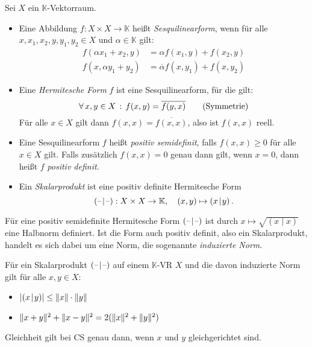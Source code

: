 \documentclass{cheat-sheet}
\newcommand{\K}{\mathbb{K}}
\newcommand{\scp}[2]{\left( #1 \!\mid\! #2 \right)} %
\begin{document}
\begin{defn}
  Sei $X$ ein $\K$-Vektorraum.
  \begin{itemize}
    \item Eine Abbildung $f : X \times X \to \K$ heißt \emph{Sesquilinearform}, wenn für alle $x, x_1, x_2, y, y_1, y_2 \in X$ und $\alpha \in \K$ gilt:
    \begin{align*}
      f(\alpha x_1 + x_2, y) &= \alpha f(x_1, y) + f(x_2, y) \tag*{(Linearität im 1. Arg)} \\
      f(x, \alpha y_1 + y_2) &= \overline{\alpha} f(x, y_1) + f(x, y_2) \tag*{(Antilinearität im 2. Arg)}
    \end{align*}
    \item Eine \emph{Hermitesche Form} $f$ ist eine Sesquilinearform, für die gilt:
    \[ \forall \, {x, y \in X} \,:\, f(x, y) = \overline{f(y, x)} \tag*{(Symmetrie)} \]
    Für alle $x \in X$ gilt dann $f(x, x) = \overline{f(x, x)}$, also ist $f(x, x)$ reell.
    \item Eine Sesquilinearform $f$ heißt \emph{positiv semidefinit}, falls $f(x, x) \geq 0$ für alle $x \in X$ gilt. Falls zusätzlich $f(x, x) = 0$ genau dann gilt, wenn $x = 0$, dann heißt $f$ \emph{positiv definit}.
    \item Ein \emph{Skalarprodukt} ist eine positiv definite Hermitesche Form
    \[ \scp{\blank}{\blank} : X \times X \to \K, \quad (x, y) \mapsto \scp{x}{y}. \]
  \end{itemize}
\end{defn}

\begin{satz}
  Für eine positiv semidefinite Hermitesche Form $\scp{\blank}{\blank}$ ist durch $x \mapsto \sqrt{\scp{x}{x}}$ eine Halbnorm definiert. Ist die Form auch positiv definit, also ein Skalarprodukt, handelt es sich dabei um eine Norm, die sogenannte \emph{induzierte Norm}.
\end{satz}

\begin{satz}
  Für ein Skalarprodukt $\scp{\blank}{\blank}$ auf einem $\K$-VR $X$ und die davon induzierte Norm gilt für alle $x, y \in X$:
  \begin{itemize}
    \item $\abs{\scp{x}{y}} \leq \norm{x} \cdot \norm{y}$ 
    \item $\lVert x+y\rVert^2 + \lVert x-y\rVert^2 = 2 (\lVert x\rVert^2 + \lVert y\rVert^2)$ 
  \end{itemize}
  Gleichheit gilt bei CS genau dann, wenn $x$ und $y$ gleichgerichtet sind.
\end{satz}
\end{document}

